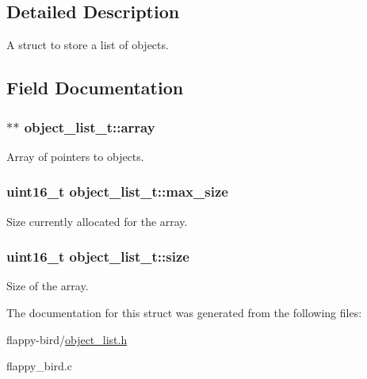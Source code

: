 \subsection{Detailed Description}
A struct to store a list of objects. 

\subsection{Field Documentation}
\subsubsection[{\texorpdfstring{array}{array}}]{ $\ast$$\ast$ object\+\_\+list\+\_\+t\+::array}\hypertarget{structobject__list__t_ab19231a7f3b4249002106ac152822819}{}\label{structobject__list__t_ab19231a7f3b4249002106ac152822819}
Array of pointers to objects. 
\subsubsection[{\texorpdfstring{max\+\_\+size}{max_size}}]{\setlength{\rightskip}{0pt plus 5cm}uint16\+\_\+t object\+\_\+list\+\_\+t\+::max\+\_\+size}\hypertarget{structobject__list__t_a577a0a7f314f10c0ffdd911f8b5a45f3}{}\label{structobject__list__t_a577a0a7f314f10c0ffdd911f8b5a45f3}
Size currently allocated for the array. 
\subsubsection[{\texorpdfstring{size}{size}}]{\setlength{\rightskip}{0pt plus 5cm}uint16\+\_\+t object\+\_\+list\+\_\+t\+::size}\hypertarget{structobject__list__t_af656fe571a2562c31ae1ac9ebd4d7e79}{}\label{structobject__list__t_af656fe571a2562c31ae1ac9ebd4d7e79}
Size of the array. 

The documentation for this struct was generated from the following files\+:\begin{DoxyCompactItemize}
\item 
flappy-\/bird/\hyperlink{object__list_8h}{object\+\_\+list.\+h}\item 
flappy\+\_\+bird.\+c\end{DoxyCompactItemize}
